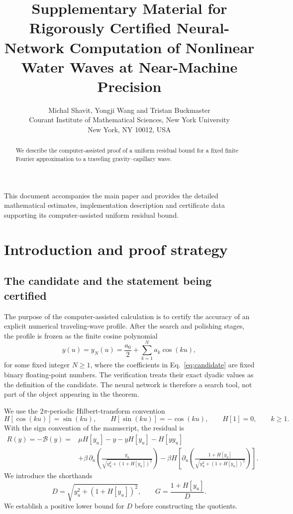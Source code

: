 \documentclass[11pt]{article}
\title{Supplementary Material for\\Rigorously Certified Neural-Network Computation of Nonlinear Water Waves at Near-Machine Precision}
\author{Michal Shavit, Yongji Wang and Tristan Buckmaster\\[0.5em]
\small Courant Institute of Mathematical Sciences, New York University\\
\small New York, NY 10012, USA}
\date{}
\numberwithin{equation}{section}
\begin{document}
\maketitle

\noindent This document accompanies the main paper and provides the detailed mathematical estimates, implementation description and certificate data supporting its computer-assisted uniform residual bound.

\begin{abstract}
We describe the computer-assisted proof of a uniform residual bound for a
fixed finite Fourier approximation to a traveling gravity--capillary wave.
\end{abstract}

\setcounter{tocdepth}{1}
\tableofcontents
\clearpage

\section{Introduction and proof strategy}
\label{sec:introduction}

\subsection{The candidate and the statement being certified}

The purpose of the computer-assisted calculation is to certify the accuracy
of an explicit numerical traveling-wave profile. After the search and
polishing stages, the profile is frozen as the finite cosine polynomial
\begin{equation}
 y(u)=y_N(u)=\frac{a_0}{2}+\sum_{k=1}^{N}a_k\cos(ku),
 \label{eq:candidate}
\end{equation}
for some fixed integer $N\geq1$, where the coefficients in
Eq.~\eqref{eq:candidate} are fixed binary floating-point numbers.
The verification treats their exact dyadic values as the definition of
the candidate. The neural network is therefore a search tool,
not part of the object appearing in the theorem.

We use the $2\pi$-periodic Hilbert-transform convention
\begin{equation}
 H[\cos(ku)]=\sin(ku),\qquad
 H[\sin(ku)]=-\cos(ku),\qquad H[1]=0,
 \qquad k\geq1.
 \label{eq:H-convention}
\end{equation}
With the sign convention of the manuscript, the residual is
\begin{equation}
 \begin{split}
 R(y)=-\mathcal B(y)
 ={}&\mu H[y_u]-y-yH[y_u]-H[yy_u]\\
 &+\beta\,\partial_u\!\left(
 \frac{y_u}{\sqrt{y_u^2+(1+H[y_u])^2}}\right)
 -\beta H\!\left[\partial_u\!\left(
 \frac{1+H[y_u]}{\sqrt{y_u^2+(1+H[y_u])^2}}\right)\right].
 \end{split}
 \label{eq:residual}
\end{equation}
We introduce the shorthands
\begin{equation}
 D=\sqrt{y_u^2+(1+H[y_u])^2},\qquad
 G=\frac{1+H[y_u]}{D}.
 \label{eq:auxiliaries}
\end{equation}
We establish a positive lower bound for $D$ before constructing the
quotients.
\end{document}
